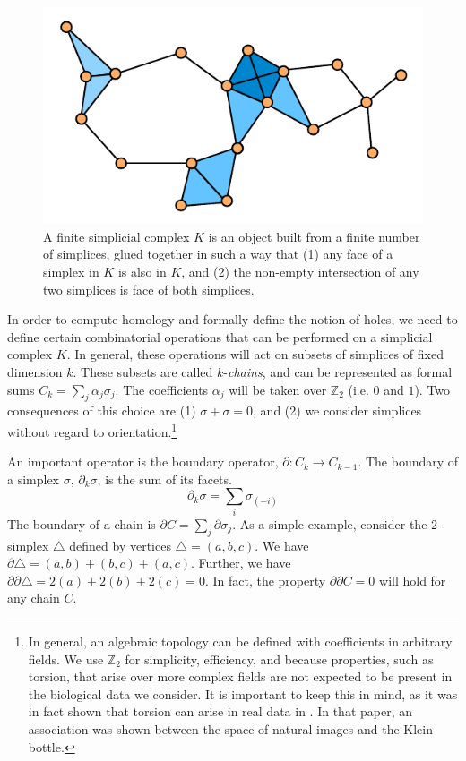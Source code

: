\begin{figure}
\centering
\includegraphics[]{./fig/background/simplicial_complex.pdf}
\caption[Simplicial Complex: A discrete topological space]{A finite simplicial complex $K$ is an object built from a finite number of simplices, glued together in such a way that (1) any face of a simplex in $K$ is also in $K$, and (2) the non-empty intersection of any two simplices is face of both simplices.}
\label{fig:bg:simplicial_complex}
\end{figure}

In order to compute homology and formally define the notion of holes, we need to define certain combinatorial operations that can be performed on a simplicial complex $K$.
In general, these operations will act on subsets of simplices of fixed dimension $k$.
These subsets are called $k$-\emph{chains}, and can be represented as formal sums $C_{k}=\sum_{j}\alpha_{j}\sigma_{j}$.
The coefficients $\alpha_j$ will be taken over $\mathbb{Z}_2$ (i.e. $0$ and $1$).
Two consequences of this choice are (1) $\sigma+\sigma=0$, and (2) we consider simplices without regard to orientation.\footnote{In general, an algebraic topology can be defined with coefficients in arbitrary fields. We use $\mathbb{Z}_2$ for simplicity, efficiency, and because properties, such as torsion, that arise over more complex fields are not expected to be present in the biological data we consider. It is important to keep this in mind, as it was in fact shown that torsion can arise in real data in \cite{Carlsson:2008up}. In that paper, an association was shown between the space of natural images and the Klein bottle.}

An important operator is the boundary operator, $\partial:C_{k}\rightarrow{C_{k-1}}$.
The boundary of a simplex $\sigma$, $\partial_{k}\sigma$, is the sum of its facets.
\begin{equation}
\partial_{k}\sigma = \sum_{i}{\sigma_{(-i)}}
\end{equation}
The boundary of a chain is $\partial C = \sum_{j}\partial\sigma_{j}$.
As a simple example, consider the $2$-simplex $\triangle$ defined by vertices $\triangle=(a,b,c)$.
We have $\partial\triangle = (a,b) + (b,c) + (a,c)$.
Further, we have $\partial\partial\triangle = 2(a) + 2(b) + 2(c) = 0$.
In fact, the property $\partial\partial C = 0$ will hold for any chain $C$.

